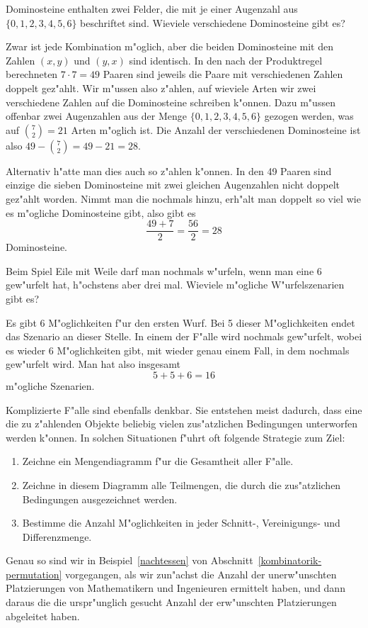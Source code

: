 \begin{beispiele}
\item Dominosteine enthalten zwei Felder, die mit je einer Augenzahl
aus $\{0,1,2,3,4,5,6\}$ beschriftet sind.
Wieviele verschiedene Dominosteine
gibt es?

\begin{loesung}
Zwar ist jede Kombination m"oglich, aber die beiden Dominosteine
mit den Zahlen $(x,y)$ und $(y,x)$ sind identisch.
In den nach der
Produktregel berechneten $7\cdot 7=49$ Paaren sind jeweils die Paare
mit verschiedenen Zahlen doppelt gez"ahlt.
Wir m"ussen also z"ahlen,
auf wieviele Arten wir zwei verschiedene Zahlen auf die Dominosteine
schreiben k"onnen.
Dazu m"ussen offenbar zwei Augenzahlen aus
der Menge $\{0,1,2,3,4,5,6\}$ gezogen werden, was auf 
$\binom{7}{2}=21$ Arten m"oglich ist.
Die Anzahl der verschiedenen
Dominosteine ist also $49 - \binom{7}{2}=49-21=28$.

Alternativ h"atte man dies auch so z"ahlen k"onnen.
In den 49 Paaren sind
einzige die sieben Dominosteine mit zwei gleichen Augenzahlen nicht doppelt
gez"ahlt worden.
Nimmt man die nochmals hinzu, erh"alt man doppelt so viel
wie es m"ogliche Dominosteine gibt, also gibt es
\[
\frac{49+7}{2}=\frac{56}2=28
\]
Dominosteine.
\end{loesung}

\item Beim Spiel Eile mit Weile darf man nochmals w"urfeln, wenn
man eine 6 gew"urfelt hat, h"ochstens aber drei mal.
Wieviele
m"ogliche W"urfelszenarien gibt es?

\begin{loesung}
Es gibt 6 M"oglichkeiten f"ur den ersten Wurf.
Bei 5 dieser M"oglichkeiten endet das Szenario an dieser Stelle.
In einem der
F"alle wird nochmals gew"urfelt, wobei es wieder 6 M"oglichkeiten
gibt, mit wieder genau einem Fall, in dem nochmals gew"urfelt wird.
Man hat also insgesamt 
\[
5 + 5 + 6=16
\]
m"ogliche Szenarien.
\end{loesung}

\end{beispiele}

Komplizierte F"alle sind ebenfalls denkbar.
Sie entstehen meist dadurch, 
dass eine die zu z"ahlenden Objekte beliebig vielen zus"atzlichen
Bedingungen unterworfen werden k"onnen.
In solchen Situationen
f"uhrt oft folgende Strategie zum Ziel:
\begin{enumerate}
\item Zeichne ein Mengendiagramm f"ur die Gesamtheit aller F"alle.
\item Zeichne in diesem Diagramm alle Teilmengen, die durch 
die zus"atzlichen Bedingungen ausgezeichnet werden.
\item Bestimme die Anzahl M"oglichkeiten in jeder Schnitt-, Vereinigungs-
und Differenzmenge.
\end{enumerate}
Genau so sind wir in Beispiel~\ref{nachtessen} von
Abschnitt~\ref{kombinatorik-permutation} vorgegangen,
als wir zun"achst die Anzahl der unerw"unschten Platzierungen
von Mathematikern und Ingenieuren ermittelt haben, und dann daraus
die die urspr"unglich gesucht Anzahl der erw"unschten Platzierungen
abgeleitet haben.

